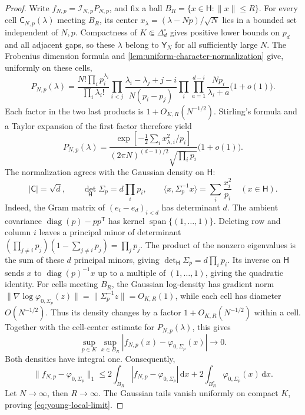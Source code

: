 \documentclass[11pt]{article}
\theoremstyle{remark}
\theoremstyle{plain}
\newcommand{\dd}{\mathrm d}
\newcommand{\diag}{\operatorname{diag}}
\begin{document}
\begin{proof}
Write \(f_{N,p}=\mathcal I_{N,p}P_{N,p}\), and fix a ball
\(B_R=\{x\in\mathsf H:\|x\|\le R\}\).
For every cell \(\mathsf C_{N,p}(\lambda)\) meeting
\(B_R\), its center \(x_\lambda=(\lambda-Np)/\sqrt N\) lies in a
bounded set independent of \(N,p\).  Compactness of
\(K\Subset\Delta_d^\circ\) gives positive lower bounds on \(p_d\)
and all adjacent gaps, so these \(\lambda\) belong to
\(\mathsf Y_N\) for all sufficiently large \(N\).
The Frobenius dimension formula and
\cref{lem:uniform-character-normalization} give, uniformly on these cells,
\[
  P_{N,p}(\lambda)
  =\frac{N!\prod_i p_i^{\lambda_i}}{\prod_i\lambda_i!}
   \prod_{i<j}\frac{\lambda_i-\lambda_j+j-i}{N(p_i-p_j)}
   \prod_i\prod_{a=1}^{d-i}\frac{Np_i}{\lambda_i+a}
   \bigl(1+o(1)\bigr).
\]
Each factor in the two last products is \(1+O_{K,R}(N^{-1/2})\).
Stirling's formula and a Taylor expansion of the first factor therefore
yield
\[
  P_{N,p}(\lambda)
  =\frac{\exp\!\left[-\frac12\sum_i x_{\lambda,i}^2/p_i\right]}
  {(2\pi N)^{(d-1)/2}\sqrt{\prod_i p_i}}\bigl(1+o(1)\bigr).
\]
The normalization agrees with the Gaussian density on \(\mathsf H\):
\[
  |\mathsf C|=\sqrt d,\qquad
  \det_{\mathsf H}\Sigma_p=d\prod_i p_i,\qquad
  \langle x,\Sigma_p^{-1}x\rangle=\sum_i\frac{x_i^2}{p_i}
  \quad(x\in\mathsf H).
\]
Indeed, the Gram matrix of \((e_i-e_d)_{i<d}\) has determinant \(d\).
The ambient covariance \(\diag(p)-pp^{\mathsf T}\) has kernel
\(\operatorname{span}\{(1,\ldots,1)\}\).  Deleting row and column \(i\)
leaves a principal minor of determinant
\((\prod_{j\ne i}p_j)(1-\sum_{j\ne i}p_j)=\prod_jp_j\).
The product of the nonzero eigenvalues is the sum of these \(d\) principal
minors, giving \(\det_{\mathsf H}\Sigma_p=d\prod_i p_i\).  Its inverse on
\(\mathsf H\) sends \(x\) to \(\diag(p)^{-1}x\) up to a multiple of
\((1,\ldots,1)\), giving the quadratic identity.
For cells meeting \(B_R\), the Gaussian log-density
has gradient norm
\(\|\nabla\log\varphi_{0,\Sigma_p}(z)\|
=\|\Sigma_p^{-1}z\|=O_{K,R}(1)\), while each cell has diameter
\(O(N^{-1/2})\).
Thus its density changes by a factor \(1+O_{K,R}(N^{-1/2})\) within a
cell.  Together with the cell-center estimate for \(P_{N,p}(\lambda)\),
this gives
\[
  \sup_{p\in K}\sup_{x\in B_R}
  |f_{N,p}(x)-\varphi_{0,\Sigma_p}(x)|\longrightarrow0.
\]
Both densities have integral one.  Consequently,
\[
  \|f_{N,p}-\varphi_{0,\Sigma_p}\|_1
  \le 2\int_{B_R}|f_{N,p}-\varphi_{0,\Sigma_p}|\,\dd x
     +2\int_{B_R^c}\varphi_{0,\Sigma_p}(x)\,\dd x.
\]
Let \(N\to\infty\), then \(R\to\infty\).  The Gaussian tails
vanish uniformly on compact \(K\), proving \eqref{eq:young-local-limit}.
\end{proof}
\end{document}
